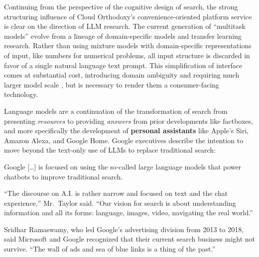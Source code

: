 Continuing from the perspective of the cognitive design of search, the
strong structuring influence of Cloud Orthodoxy's convenience-oriented
platform service is clear on the direction of LLM research. The current
generation of ``multitask models'' evolve from a lineage of
domain-specific models and transfer learning research. Rather than using
mixture models with domain-specific representations of input, like
numbers for numerical problems, all input structure is discarded in
favor of a single natural language text prompt. This simplification of
interface comes at substantial cost, introducing domain ambiguity and
requiring much larger model scale \cite{raffelExploringLimitsTransfer2020} , but is necessary to render them
a consumer-facing technology.

Language models are a continuation of the transformation of search from
presenting \emph{resources} to providing \emph{answers} from prior
developments like factboxes, and more specifically the development of
\textbf{personal assistants} like Apple's Siri, Amazon Alexa, and Google Home.
Google executives describe the intention to move beyond the text-only
use of LLMs to replace traditional search:

\begin{leftbar}
Google {[}\ldots{]} is focused on using the so-called large language
models that power chatbots to improve traditional search.

``The discourse on A.I. is rather narrow and focused on text and the
chat experience,'' Mr.~Taylor said. ``Our vision for search is about
understanding information and all its forms: language, images, video,
navigating the real world.''

Sridhar Ramaswamy, who led Google's advertising division from 2013 to
2018, said Microsoft and Google recognized that their current search
business might not survive. ``The wall of ads and sea of blue links is a
thing of the past.'' \cite{mickleChatbotsAreHere2023} 
\end{leftbar}

